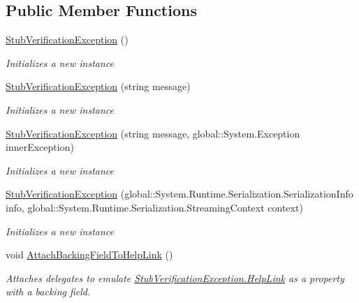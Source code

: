 \subsection*{Public Member Functions}
\begin{DoxyCompactItemize}
\item 
\hyperlink{class_system_1_1_security_1_1_fakes_1_1_stub_verification_exception_afe7277054beb561158be7d487a5cf700}{Stub\-Verification\-Exception} ()
\begin{DoxyCompactList}\small\item\em Initializes a new instance\end{DoxyCompactList}\item 
\hyperlink{class_system_1_1_security_1_1_fakes_1_1_stub_verification_exception_aed39f2f27d5aaf21e4f065898f60d131}{Stub\-Verification\-Exception} (string message)
\begin{DoxyCompactList}\small\item\em Initializes a new instance\end{DoxyCompactList}\item 
\hyperlink{class_system_1_1_security_1_1_fakes_1_1_stub_verification_exception_a0a06e51c085463724698c99b3a152fd6}{Stub\-Verification\-Exception} (string message, global\-::\-System.\-Exception inner\-Exception)
\begin{DoxyCompactList}\small\item\em Initializes a new instance\end{DoxyCompactList}\item 
\hyperlink{class_system_1_1_security_1_1_fakes_1_1_stub_verification_exception_aaced85f4b027e36694562432893b1cc0}{Stub\-Verification\-Exception} (global\-::\-System.\-Runtime.\-Serialization.\-Serialization\-Info info, global\-::\-System.\-Runtime.\-Serialization.\-Streaming\-Context context)
\begin{DoxyCompactList}\small\item\em Initializes a new instance\end{DoxyCompactList}\item 
void \hyperlink{class_system_1_1_security_1_1_fakes_1_1_stub_verification_exception_a186bc195747787892dcbafcce6fb09e8}{Attach\-Backing\-Field\-To\-Help\-Link} ()
\begin{DoxyCompactList}\small\item\em Attaches delegates to emulate \hyperlink{class_system_1_1_security_1_1_fakes_1_1_stub_verification_exception_a92f3df1938bccaaecc3ec6aa4e5f5391}{Stub\-Verification\-Exception.\-Help\-Link} as a property with a backing field.\end{DoxyCompactList}\item 

\end{DoxyCompactItemize}
